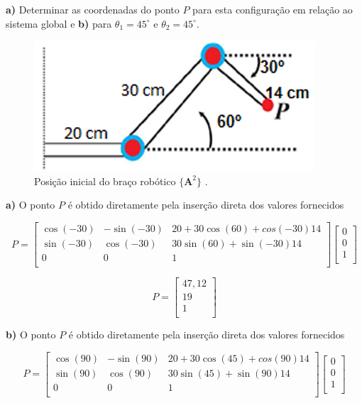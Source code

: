 \noindent\textbf{a)} Determinar as coordenadas do ponto $P$ para esta configuração em relação ao sistema global e \textbf{b)} para $\theta_1 = 45^{\circ}$ e $\theta_2 = 45^{\circ}$.

\begin{figure}[H]
	\centering
	\includegraphics[scale=1.00]{a_robo6.png}
	\caption{Posição inicial do braço robótico $\{\mathbf{A}^2\}$ \cite{sirlandro2017}.}
\end{figure} 

\noindent\textbf{a)} O ponto $P$ é obtido diretamente pela inserção direta dos valores fornecidos

\[
P = \begin{bmatrix}
	\cos(-30) & -\sin(-30) & 20 + 30\cos(60)+ cos(-30)14\\
	\sin(-30) & \cos(-30) & 30\sin(60) + \sin(-30)14\\
	0 & 0 & 1\\
\end{bmatrix}
\begin{bmatrix}
	0\\
	0\\
	1\\
\end{bmatrix}
\]

\[
P = \begin{bmatrix}
	47,12\\
	19\\
	1\\
\end{bmatrix}
\]

\noindent\textbf{b)} O ponto $P$ é obtido diretamente pela inserção direta dos valores fornecidos

\[
P = \begin{bmatrix}
	\cos(90) & -\sin(90) & 20 + 30\cos(45)+ cos(90)14\\
	\sin(90) & \cos(90) & 30\sin(45) + \sin(90)14\\
	0 & 0 & 1\\
\end{bmatrix}
\begin{bmatrix}
	0\\
	0\\
	1\\
\end{bmatrix}
\]

